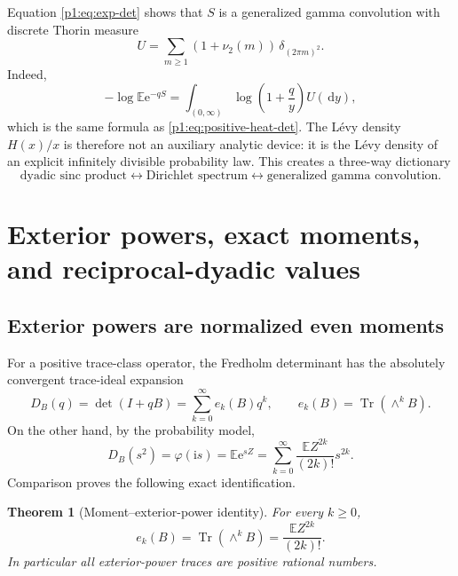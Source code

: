 \documentclass[11pt,oneside]{article}
\newtheorem{theorem}{Theorem}[section]
\theoremstyle{definition}
\newcommand{\dd}{\,\mathrm d}
\newcommand{\e}{\mathrm e}
\newcommand{\ii}{\mathrm i}
\newcommand{\E}{\mathbb E}
\newcommand{\Tr}{\operatorname{Tr}}
\newcommand{\vtwo}{\nu_2}
\newcommand{\phiF}{\varphi}
\begin{document}
Equation \eqref{p1:eq:exp-det} shows that \(S\) is a generalized gamma convolution with
discrete Thorin measure
\begin{equation}
 U=\sum_{m\ge1}(1+\vtwo(m))\,\delta_{(2\pi m)^2}.
 \label{p1:eq:Thorin}
\end{equation}
Indeed,
\begin{equation}
 -\log\E\e^{-qS}
 =\int_{(0,\infty)}\log\!\left(1+\frac qy\right)U(\dd y),
 \label{p1:eq:Thorin-log}
\end{equation}
which is the same formula as \eqref{p1:eq:positive-heat-det}.  The L\'evy density
\(H(x)/x\) is therefore not an auxiliary analytic device: it is the L\'evy density of
an explicit infinitely divisible probability law.  This creates a three-way dictionary
\[
 \text{dyadic sinc product}
 \longleftrightarrow
 \text{Dirichlet spectrum}
 \longleftrightarrow
 \text{generalized gamma convolution}.
\]

\section{Exterior powers, exact moments, and reciprocal-dyadic values}
\label{p1:sec:exterior-dyadic}

\subsection{Exterior powers are normalized even moments}

For a positive trace-class operator, the Fredholm determinant has the absolutely
convergent trace-ideal expansion~\cite{p1:SimonTrace,p1:GohbergKrein}
\begin{equation}
 D_B(q)=\det(I+qB)=\sum_{k=0}^{\infty}e_k(B)q^k,
 \qquad
 e_k(B)=\Tr(\wedge^kB).
 \label{p1:eq:det-exterior-expansion}
\end{equation}
On the other hand, by the probability model,
\begin{equation}
 D_B(s^2)=\phiF(\ii s)=\E\e^{sZ}
 =\sum_{k=0}^{\infty}\frac{\E Z^{2k}}{(2k)!}s^{2k}.
 \label{p1:eq:mgf-exterior}
\end{equation}
Comparison proves the following exact identification.

\begin{theorem}[Moment--exterior-power identity]
\label{p1:thm:moment-exterior}
For every \(k\ge0\),
\begin{equation}
 \boxed{\quad
 e_k(B)=\Tr(\wedge^kB)=\frac{\E Z^{2k}}{(2k)!}.
 \quad}
 \label{p1:eq:moment-exterior}
\end{equation}
In particular all exterior-power traces are positive rational numbers.
\end{theorem}
\end{document}
